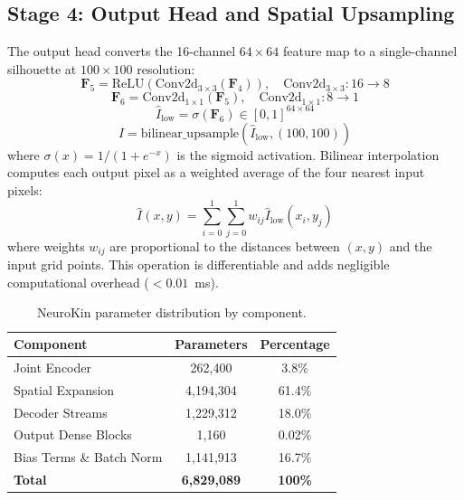\documentclass[12pt,a4paper,oneside]{report}
\begin{document}
\subsection{Stage 4: Output Head and Spatial Upsampling}
\label{subsec:stage_4_output}
The output head converts the 16-channel $64 \times 64$ feature map to a single-channel silhouette at $100 \times 100$ resolution:
\begin{equation}
\mathbf{F}_5 = \text{ReLU}(\text{Conv2d}_{3\times3}(\mathbf{F}_4)), \quad \text{Conv2d}_{3\times3}: 16 \rightarrow 8
\end{equation}
\begin{equation}
\mathbf{F}_6 = \text{Conv2d}_{1\times1}(\mathbf{F}_5), \quad \text{Conv2d}_{1\times1}: 8 \rightarrow 1
\end{equation}
\begin{equation}
\hat{I}_{\text{low}} = \sigma(\mathbf{F}_6) \in [0, 1]^{64 \times 64}
\end{equation}
\begin{equation}
\hat{I} = \text{bilinear\_upsample}(\hat{I}_{\text{low}}, (100, 100))
\end{equation}
where $\sigma(x) = 1/(1 + e^{-x})$ is the sigmoid activation. Bilinear interpolation computes each output pixel as a weighted average of the four nearest input pixels:
\begin{equation}
\hat{I}(x,y) = \sum_{i=0}^{1}\sum_{j=0}^{1} w_{ij} \hat{I}_{\text{low}}(x_i, y_j)
\end{equation}
where weights $w_{ij}$ are proportional to the distances between $(x,y)$ and the input grid points. This operation is differentiable and adds negligible computational overhead ($<0.01$~ms).

\begin{table}[H]
\centering
\caption{NeuroKin parameter distribution by component.}
\label{tab:neurokin_params}
\begin{tabular}{lcc}
\toprule
\textbf{Component} & \textbf{Parameters} & \textbf{Percentage} \\
\midrule
Joint Encoder & 262,400 & 3.8\% \\
Spatial Expansion & 4,194,304 & 61.4\% \\
Decoder Streams & 1,229,312 & 18.0\% \\
Output Dense Blocks & 1,160 & 0.02\% \\
Bias Terms \& Batch Norm & 1,141,913 & 16.7\% \\
\midrule
\textbf{Total} & \textbf{6,829,089} & \textbf{100\%} \\
\bottomrule
\end{tabular}
\end{table}
\end{document}
